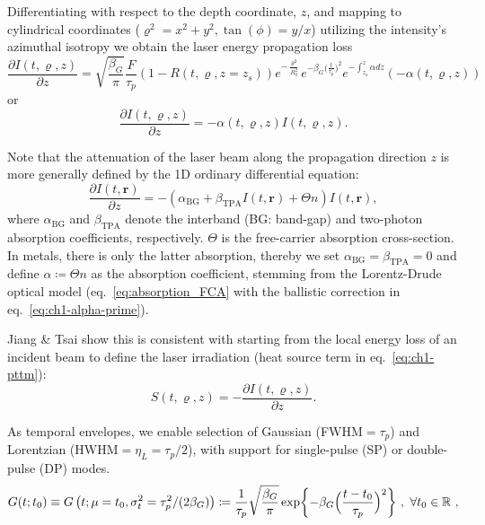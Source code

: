 Differentiating with respect to the depth coordinate, $z$, and mapping to cylindrical coordinates ($\varrho^2 = x^2 + y^2, \tan(\phi) = y/x$) utilizing the intensity's azimuthal isotropy we obtain the laser energy propagation loss
\begin{equation}
  \frac{\partial I(t,\varrho,z)}{\partial z}
  = \sqrt{\frac{\beta_G}{\pi}} \frac{F}{\tau_p} (1 - R(t,\varrho, z=z_s))
  e^{-\frac{\varrho^2}{R_0^2}}e^{-\beta_G \bigl(\frac{t}{\tau_p}\bigr)^2}e^{-\int_{z_s}^z\alpha dz}(-\alpha(t,\varrho,z))
  \label{eq:ch1-energy_propagation_loss_cylindrical}
\end{equation}
or
\begin{equation}
  \frac{\partial I(t,\varrho,z)}{\partial z} = -\alpha(t,\varrho,z) I(t,\varrho,z).
  \label{eq:ch1-energy_propagation_loss}
\end{equation}

Note that the attenuation of the laser beam along the propagation direction $z$ is more generally defined by the 1D ordinary differential equation:\cite{Driel_1987, Jiang_2007, Vaghasiya_2022}
\begin{equation}
  \frac{\partial I(t, \mathbf{r})}{\partial z} = - (\alpha_\text{BG} + \beta_\text{TPA} I(t, \mathbf{r}) + \Theta n) I(t, \mathbf{r}),
  \label{eq:ch1-energy_propagation_loss_general}
\end{equation}
where $\alpha_\text{BG}$ and $\beta_\text{TPA}$ denote the interband (BG: band-gap) and two-photon absorption coefficients, respectively.
$\Theta$ is the free-carrier absorption cross-section.
In metals, there is only the latter absorption, thereby we set $\alpha_\text{BG} = \beta_\text{TPA} = 0$ and define $\alpha \coloneqq \Theta n$ as the absorption coefficient, stemming from the Lorentz-Drude optical model
(eq.~\eqref{eq:absorption_FCA} with the ballistic correction in eq.~\eqref{eq:ch1-alpha-prime}).

Jiang \& Tsai show this is consistent with starting from the local energy loss of an incident beam to define the laser irradiation (heat source term in eq.~\eqref{eq:ch1-pttm}):\cite{Jiang_2007}
\begin{equation}
  S(t,\varrho,z) = - \frac{\partial I(t,\varrho,z)}{\partial z}.
  \label{eq:heat_source}
\end{equation}

As temporal envelopes, we enable selection of Gaussian (FWHM$=\tau_p$) and Lorentzian (HWHM$=\eta_L=\tau_p/2$),
with support for single-pulse (SP) or double-pulse (DP) modes.
\begin{equation}
  G(t; t_0) \equiv G\left(t; \mu = t_0, \sigma_t^2 = \tau_p^2/(2\beta_G) \right) \coloneqq \frac{1}{\tau_p}\sqrt{\frac{\beta_G}{\pi}} \exp\biggl\{ - \beta_G \Bigr(\frac{t - t_0}{\tau_p}\Bigl)^2 \biggr\} \ , \ \forall t_0 \in \mathbb{R} \ ,
  \label{eq:ch1-gaussian}
\end{equation}


